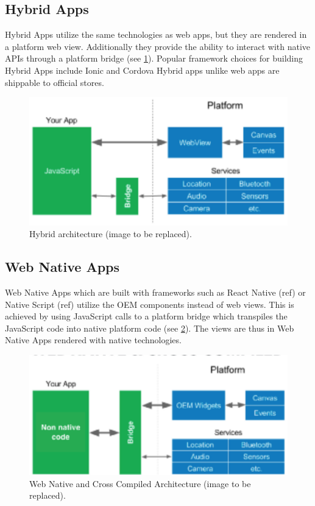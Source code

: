 \subsection{Hybrid Apps}
Hybrid Apps utilize the same technologies as web apps, but they are rendered in a platform web view. Additionally they provide the ability to 
interact with native APIs through a platform bridge (see \ref{fig:hybrid_architecture}). 
Popular framework choices for building Hybrid Apps include Ionic and Cordova 
Hybrid apps unlike web apps are shippable to official stores.

\begin{figure}
    \includegraphics[width=\linewidth]{images/architectures/hybrid_architecture.eps}
    \caption{Hybrid architecture (image to be replaced).}
    \label{fig:hybrid_architecture}
\end{figure}

\subsection{Web Native Apps}
Web Native Apps which are built with frameworks such as React Native (ref) or Native Script (ref) utilize the OEM components instead of web views.
This is achieved by using JavaScript calls to a platform bridge which transpiles the JavaScript code into native platform code (see \ref{fig:web_native_architecture}). 
The views are thus in Web Native Apps rendered with native technologies.

\begin{figure}
    \includegraphics[width=\linewidth]{images/architectures/native_web_app_architecture.eps}
    \caption{Web Native and Cross Compiled Architecture (image to be replaced).}
    \label{fig:web_native_architecture}
\end{figure}

